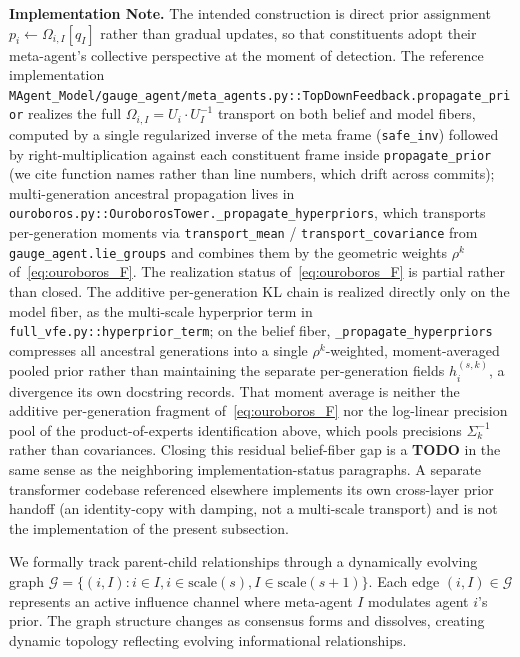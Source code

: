 \documentclass[11pt]{article}
\begin{document}
\textbf{Implementation Note.} The intended construction is direct prior assignment $p_i \leftarrow \Omega_{i,I}[q_I]$ rather than gradual updates, so that constituents adopt their meta-agent's collective perspective at the moment of detection. The reference implementation \texttt{MAgent\_Model/gauge\_agent/meta\_agents.py::TopDownFeedback.propagate\_prior} realizes the full $\Omega_{i,I} = U_i \cdot U_I^{-1}$ transport on both belief and model fibers, computed by a single regularized inverse of the meta frame (\texttt{safe\_inv}) followed by right-multiplication against each constituent frame inside \texttt{propagate\_prior} (we cite function names rather than line numbers, which drift across commits); multi-generation ancestral propagation lives in \texttt{ouroboros.py::OuroborosTower.\_propagate\_hyperpriors}, which transports per-generation moments via \texttt{transport\_mean} / \texttt{transport\_covariance} from \texttt{gauge\_agent.lie\_groups} and combines them by the geometric weights $\rho^k$ of~\eqref{eq:ouroboros_F}. The realization status of~\eqref{eq:ouroboros_F} is partial rather than closed. The additive per-generation KL chain is realized directly only on the model fiber, as the multi-scale hyperprior term in \texttt{full\_vfe.py::hyperprior\_term}; on the belief fiber, \texttt{\_propagate\_hyperpriors} compresses all ancestral generations into a single $\rho^k$-weighted, moment-averaged pooled prior rather than maintaining the separate per-generation fields $h_i^{(s,k)}$, a divergence its own docstring records. That moment average is neither the additive per-generation fragment of~\eqref{eq:ouroboros_F} nor the log-linear precision pool of the product-of-experts identification above, which pools precisions $\Sigma_k^{-1}$ rather than covariances. Closing this residual belief-fiber gap is a \textbf{TODO} in the same sense as the neighboring implementation-status paragraphs. A separate transformer codebase referenced elsewhere implements its own cross-layer prior handoff (an identity-copy with damping, not a multi-scale transport) and is not the implementation of the present subsection.

We formally track parent-child relationships through a dynamically evolving graph $\mathcal{G} = \{(i, I) : i \in I,  i \in \text{scale}(s),  I \in \text{scale}(s+1)\}$. Each edge $(i, I) \in \mathcal{G}$ represents an active influence channel where meta-agent $I$ modulates agent $i$'s prior. The graph structure changes as consensus forms and dissolves, creating dynamic topology reflecting evolving informational relationships.
\end{document}
